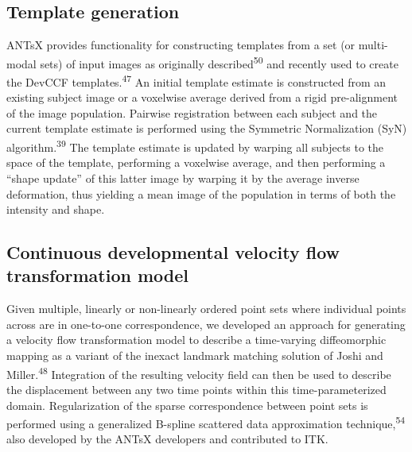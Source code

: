 \documentclass[
  12pt,
]{article}
\begin{document}
\hypertarget{template-generation}{%
\subsection*{Template generation}\label{template-generation}}

ANTsX provides functionality for constructing templates from a set (or
multi-modal sets) of input images as originally
described\textsuperscript{50} and recently used to create the DevCCF
templates.\textsuperscript{47} An initial template estimate is
constructed from an existing subject image or a voxelwise average
derived from a rigid pre-alignment of the image population. Pairwise
registration between each subject and the current template estimate is
performed using the Symmetric Normalization (SyN)
algorithm.\textsuperscript{39} The template estimate is updated by
warping all subjects to the space of the template, performing a
voxelwise average, and then performing a ``shape update'' of this latter
image by warping it by the average inverse deformation, thus yielding a
mean image of the population in terms of both the intensity and shape.

\hypertarget{continuous-developmental-velocity-flow-transformation-model}{%
\subsection*{Continuous developmental velocity flow transformation
model}\label{continuous-developmental-velocity-flow-transformation-model}}

Given multiple, linearly or non-linearly ordered point sets where
individual points across are in one-to-one correspondence, we developed
an approach for generating a velocity flow transformation model to
describe a time-varying diffeomorphic mapping as a variant of the
inexact landmark matching solution of Joshi and
Miller.\textsuperscript{48} Integration of the resulting velocity field
can then be used to describe the displacement between any two time
points within this time-parameterized domain. Regularization of the
sparse correspondence between point sets is performed using a
generalized B-spline scattered data approximation
technique,\textsuperscript{54} also developed by the ANTsX developers
and contributed to ITK.
\end{document}
